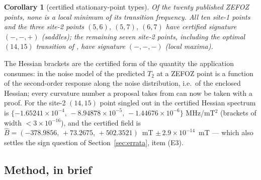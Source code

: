 \documentclass[11pt]{amsart}
\theoremstyle{plain}
\newtheorem{corollary}[theorem]{Corollary}
\theoremstyle{definition}
\theoremstyle{remark}
\begin{document}
\begin{corollary}[certified stationary-point types]\label{cor:sig}
Of the twenty published ZEFOZ points, none is a local minimum of its
transition frequency.  All ten site-1 points and the three site-2 points
$(5,6)$, $(5,7)$, $(6,7)$ have certified signature $(-,-,+)$ (saddles); the
remaining seven site-2 points, including the optimal $(14,15)$ transition of
\cite{Matsuura}, have signature $(-,-,-)$ (local maxima).
\end{corollary}

The Hessian brackets are the certified form of the quantity the application
consumes: in the noise model of \cite[Eq.~(8)]{Matsuura} the predicted $T_2$ at
a ZEFOZ point is a function of the second-order response along the noise
distribution, i.e.\ of the enclosed Hessian; every curvature number a
proposal takes from \cite{Matsuura} can now be taken with a proof.  For the
site-2 $(14,15)$ point singled out in \cite{Matsuura} the certified Hessian
spectrum is
$\{-1.65241\times10^{-4},\,-8.94878\times10^{-5},\,-1.44676\times10^{-6}\}$
MHz/mT$^2$ (brackets of width $<3\times10^{-16}$), and the certified field is
$\hat B=(-378.9856,\,+73.2675,\,+502.3521)$~mT $\pm\,2.9\times10^{-14}$~mT ---
which also settles the sign question of Section~\ref{sec:errata}, item (E3).

\subsection{Method, in brief}\label{sec:method}
\end{document}
